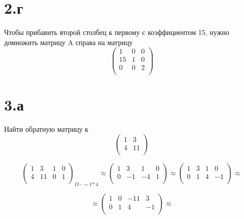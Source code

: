 \documentclass[a4paper]{article}
\begin{document}
\section*{2.г}
Чтобы прибавить второй столбец к первому с коэффициентом 15, нужно домножить матрицу A справа на матрицу 
\begin{equation*}
\begin{pmatrix}
1 & 0 & 0\\
15 & 1 & 0\\
0 & 0 & 2\\
\end{pmatrix}
\end{equation*}

\section*{3.а}
Найти обратную матрицу к 
\begin{equation*}
\begin{pmatrix}
1 & 3\\
4 & 11\\
\end{pmatrix}
\end{equation*}

\begin{equation*}
 \left(\begin{array}{rr|rr}
   1 & 3 & 1 & 0\\
   4 & 11 & 0 & 1\\
   \end{array}\right)_{II -= I * 4}
   \approx
   \left(\begin{array}{rr|rr}
   1 & 3 & 1 & 0\\
   0 & -1 & -4 & 1\\
   \end{array}\right)
\approx
   \left(\begin{array}{rr|rr}
   1 & 3 & 1 & 0\\
   0 & 1 & 4 & -1\\
   \end{array}\right)
  \approx
\end{equation*}

\begin{equation*}
\approx
   \left(\begin{array}{rr|rr}
   1 & 0 & -11 & 3\\
   0 & 1 & 4 & -1\\
   \end{array}\right)
  \approx
\end{equation*}
\end{document}
